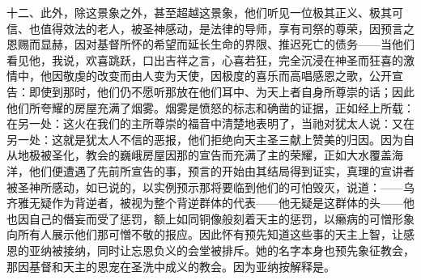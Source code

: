 十二、\newline{}此外，除这景象之外，甚至超越这景象，他们听见一位极其正义、极其可信、也值得效法的老人，被圣神感动，是法律的导师，享有司祭的尊荣，因预言之恩赐而显赫，因对基督所怀的希望而延长生命的界限、推迟死亡的债务——当他们看见他，我说，欢喜跳跃，口出吉祥之言，心喜若狂，完全沉浸在神圣而狂喜的激情中，他因敬虔的改变而由人变为天使，因极度的喜乐而高唱感恩之歌，公开宣告：即使到那时，他们仍不愿听那放在他们耳中、为天上者自身所尊崇的话；因此他们所夸耀的房屋充满了烟雾。烟雾是愤怒的标志和确凿的证据，正如经上所载：在另一处：这火在我们的主所尊崇的福音中清楚地表明了，当祂对犹太人说：又在另一处：这就是犹太人不信的恶报，他们拒绝向天主圣三献上赞美的归因。因为自从地极被圣化，教会的巍峨房屋因那的宣告而充满了主的荣耀，正如大水覆盖海洋，他们便遭遇了先前所宣告的事，预言的开始由其结局得到证实，真理的宣讲者被圣神所感动，如已说的，以实例预示那将要临到他们的可怕毁灭，说道：——乌齐雅无疑作为背逆者，被视为整个背逆群体的代表——他无疑是这群体的头——他也因自己的僭妄而受了惩罚，额上如同铜像般刻着天主的惩罚，以癞病的可憎形象向所有人展示他们那可憎不敬的报应。因此怀有预先知道这些事的天主上智，让感恩的亚纳被接纳，同时让忘恩负义的会堂被排斥。她的名字本身也预先象征教会，那因基督和天主的恩宠在圣洗中成义的教会。因为亚纳按解释是。\par

